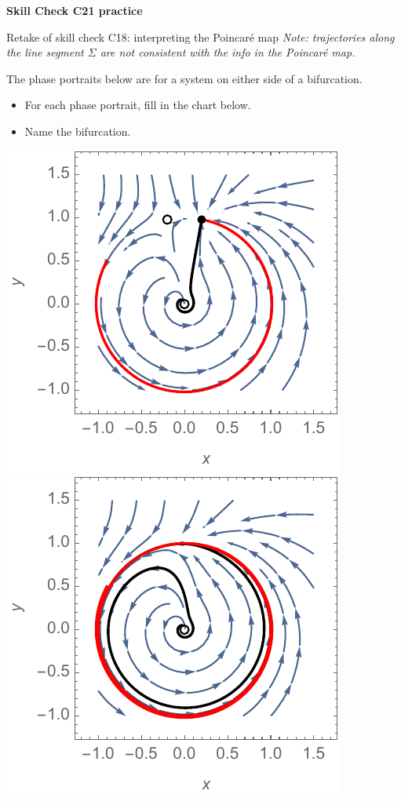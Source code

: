 \documentclass[12pt,letterpaper,noanswers]{exam}
\begin{document}
\noindent\textbf{Skill Check C21 practice}
\begin{questions}
\item Retake of skill check C18: interpreting the Poincar\'e map \emph{Note: trajectories along the line segment $\Sigma$ are not consistent with the info in the Poincar\'e map.}


\item The phase portraits below are for a system on either side of a bifurcation.
\begin{itemize}
    \item For each phase portrait, fill in the chart below.
        \item Name the bifurcation.
\end{itemize}

\includegraphics{img/C20-21sniperp1.pdf}
\includegraphics{img/C20-21sniperp1b.pdf}


\end{questions}
\end{document}
